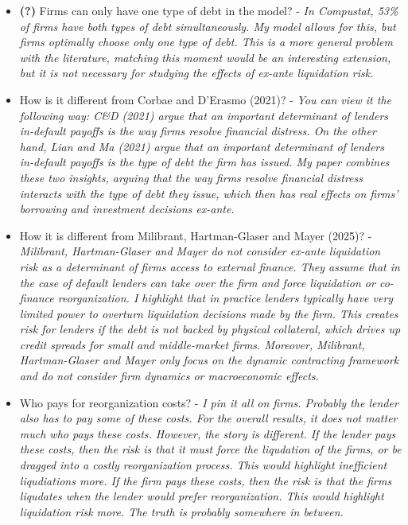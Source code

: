 \documentclass[12pt]{article}
\begin{document}
\begin{itemize}
    \item \textbf{(?)} Firms can only have one type of debt in the model? - \textit{In Compustat, 53\% of firms have both types of debt simultaneously. My model allows for this, but firms optimally choose only one type of debt. This is a more general problem with the literature, matching this moment would be an interesting extension, but it is not necessary for studying the effects of ex-ante liquidation risk.}
    \item How is it different from Corbae and D'Erasmo (2021)? - \textit{You can view it the following way: C\&D (2021) argue that an important determinant of lenders in-default payoffs is the way firms resolve financial distress. On the other hand, Lian and Ma (2021) argue that an important determinant of lenders in-default payoffs is the type of debt the firm has issued. My paper combines these two insights, arguing that the way firms resolve financial distress interacts with the type of debt they issue, which then has real effects on firms' borrowing and investment decisions ex-ante.}
    \item How it is different from Milibrant, Hartman-Glaser and Mayer (2025)? - \textit{Milibrant, Hartman-Glaser and Mayer do not consider ex-ante liquidation risk as a determinant of firms access to external finance. They assume that in the case of default lenders can take over the firm and force liquidation or co-finance reorganization. I highlight that in practice lenders typically have very limited power to overturn liquidation decisions made by the firm. This creates risk for lenders if the debt is not backed by physical collateral, which drives up credit spreads for small and middle-market firms. Moreover, Milibrant, Hartman-Glaser and Mayer only focus on the dynamic contracting framework and do not consider firm dynamics or macroeconomic effects.}
    \item Who pays for reorganization costs? - \textit{I pin it all on firms. Probably the lender also has to pay some of these costs. For the overall results, it does not matter much who pays these costs. However, the story is different. If the lender pays these costs, then the risk is that it must force the liqudation of the firms, or be dragged into a costly reorganization process. This would highlight inefficient liqudiations more. If the firm pays these costs, then the risk is that the firms liqudates when the lender would prefer reorganization. This would highlight liquidation risk more. The truth is probably somewhere in between.}

\end{itemize} \normalsize
\end{document}
